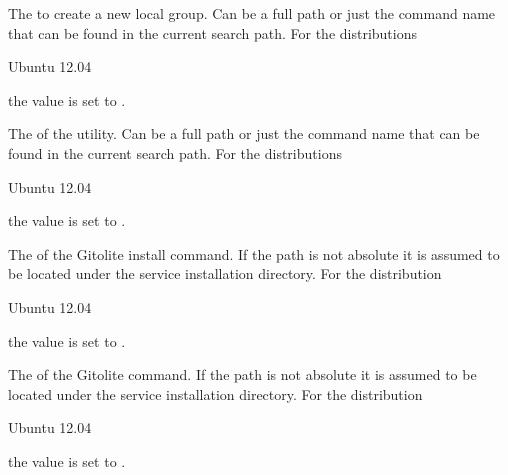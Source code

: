 
The  to create a new local group. Can be a full path or
just the command name that can be found in the current search path. 
For the distributions
\begin{inparaitem}
\item[\TheDistribution{ubuntu}] Ubuntu 12.04
\end{inparaitem}
the value is set to .


The  of the  utility. Can be a full path or
just the command name that can be found in the current search path. 
For the distributions
\begin{inparaitem}
\item[\TheDistribution{ubuntu}] Ubuntu 12.04
\end{inparaitem}
the value is set to .


The  of the Gitolite install command. If the path is not absolute it
is assumed to be located under the service installation directory.
For the distribution
\begin{inparaitem}
\item[\TheDistribution{ubuntu}] Ubuntu 12.04
\end{inparaitem}
the value is set to .


The  of the Gitolite command. If the path is not absolute it
is assumed to be located under the service installation directory.
For the distribution
\begin{inparaitem}
\item[\TheDistribution{ubuntu}] Ubuntu 12.04
\end{inparaitem}
the value is set to .

